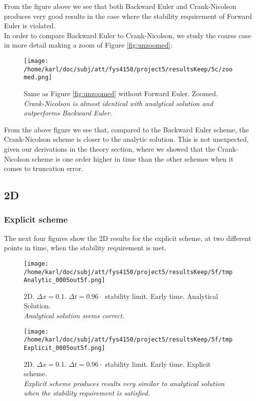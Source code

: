\documentclass{article}
\begin{document}
From the figure above we see that both Backward Euler and Crank-Nicolson produces very good results in the case where the stability requirement of Forward Euler is violated.\\

In order to compare Backward Euler to Crank-Nicolson, we study the coarse case in more detail making a zoom of Figure \ref{fig:unzoomed}:

\begin{figure}[H]
	\centering
	\texttt{[image: /home/karl/doc/subj/att/fys4150/project5/resultsKeep/5c/zoomed.png]}
	\caption{Same as Figure \ref{fig:unzoomed} without Forward Euler. Zoomed. \\ \textit{Crank-Nicolson is almost identical with analytical solution and outperforms Backward Euler.}}
	\label{1}
\end{figure}


From the above figure we see that, compared to the Backward Euler scheme, the Crank-Nicolson scheme is closer to the analytic solution. This is not unexpected, given our derivations in the theory section, where we showed that the Crank-Nicolson scheme is one order higher in time than the other schemes when it comes to truncation error.

\subsection{2D}

\subsubsection{Explicit scheme}
The next four figures show the 2D results for the explicit scheme, at two different points in time, when the stability requirement is met.

\begin{minipage}{.45\textwidth} 
	\begin{figure}[H]
		\centering
		\texttt{[image: /home/karl/doc/subj/att/fys4150/project5/resultsKeep/5f/tmpAnalytic\_0005out5f.png]}
		\caption{2D. $\Delta x = 0.1$. $\Delta t = 0.96 \cdot$ stability limit. Early time. Analytical Solution.\\ \textit{Analytical solution seems correct.}}
		\label{fig:fig2d1}
	\end{figure}
\end{minipage}\hfill
\begin{minipage}{.45\textwidth} 
	\begin{figure}[H]
		\centering
		\texttt{[image: /home/karl/doc/subj/att/fys4150/project5/resultsKeep/5f/tmpExplicit\_0005out5f.png]}
		\caption{2D. $\Delta x = 0.1$. $\Delta t = 0.96 \cdot$ stability limit. Early time. Explicit scheme.\\ \textit{Explicit scheme produces results very similar to analytical solution when the stability requirement is satisfied.}}
		\label{fig:fig2d2}
	\end{figure}
\end{minipage}\hfill
\vspace{2ex}
\end{document}
